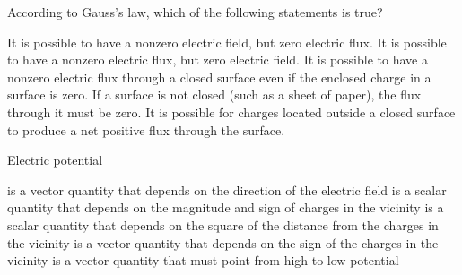 \documentclass{../../../oss-classkick-exam}
\begin{document}
\begin{multicols*}{2}
\begin{questions}
   \question According to Gauss's law, which of the following statements is
   true?
   \begin{choices}
     \choice It is possible to have a nonzero electric field, but zero electric
     flux.
     \choice It is possible to have a nonzero electric flux, but zero electric
     field.
     \choice It is possible to have a nonzero electric flux through a closed
     surface even if the enclosed charge in a surface is zero.
     \choice If a surface is not closed (such as a sheet of paper), the flux
     through it must be zero.
     \choice It is possible for charges located outside a closed surface to
     produce a net positive flux through the surface.
   \end{choices}
   \columnbreak
   
   
   \question Electric potential
   \begin{choices}
     \choice is a vector quantity that depends on the direction of the electric
     field
     \choice is a scalar quantity that depends on the magnitude and sign of
     charges in the vicinity
     \choice is a scalar quantity that depends on the square of the distance
     from the charges in the vicinity
     \choice is a vector quantity that depends on the sign of the charges in the
     vicinity
     \choice is a vector quantity that must point from high to low potential
   \end{choices}
   \vspace{.7in}
   


\end{questions}
\end{multicols*}
\end{document}
